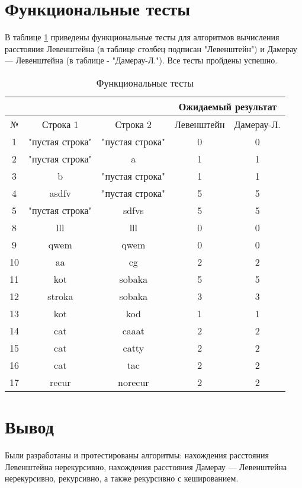 \section{Функциональные тесты}
В таблице \ref{tabular:functional_test} приведены функциональные тесты для алгоритмов вычисления расстояния Левенштейна (в таблице столбец подписан "Левенштейн") и Дамерау — Левенштейна (в таблице - "Дамерау-Л."). Все тесты пройдены успешно.


\begin{table}[h]
	\begin{center}
		\caption{\label{tabular:functional_test} Функциональные тесты}
		\begin{tabular}{|c|c|c|c|c|}
			\hline
			& & & \multicolumn{2}{c|}{Ожидаемый результат} \\
			\hline
			№&Строка 1&Строка 2&Левенштейн&Дамерау-Л. \\
			\hline
			1&"пустая строка"&"пустая строка"&0&0 \\
			\hline
			2&"пустая строка"&a&1&1 \\
			\hline
			3&b&"пустая строка"&1&1 \\
			\hline
			4&asdfv&"пустая строка"&5&5 \\
			\hline
			5&"пустая строка"&sdfvs&5&5 \\
			\hline
			8&lll&lll&0&0 \\
			\hline
			9&qwem&qwem&0&0 \\
			\hline
			10&aa&cg&2&2 \\
			\hline
			11&kot&sobaka&5&5 \\
			\hline
			12&stroka&sobaka&3&3 \\
			\hline
			13&kot&kod&1&1 \\
			\hline
			14&cat&caaat&2&2 \\
			\hline
			15&cat&catty&2&2 \\
			\hline
			16&cat&tac&2&2 \\
			\hline
			17&recur&norecur&2&2 \\
			\hline
		\end{tabular}
	\end{center}
\end{table}


\section*{Вывод}

Были разработаны и протестированы алгоритмы: нахождения расстояния Левенштейна нерекурсивно, нахождения расстояния Дамерау — Левенштейна нерекурсивно, рекурсивно, а также рекурсивно с кешированием.
